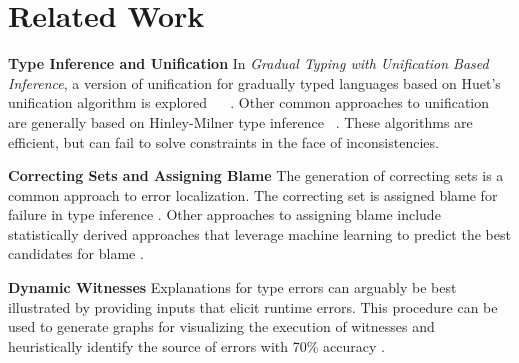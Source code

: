 \section{Related Work}
\label{sec:related}
\textbf{Type Inference and Unification} In \emph{Gradual Typing with Unification Based Inference}, a version of unification for gradually typed languages based on Huet's unification algorithm is explored ~\cite{GradualInfer} ~\cite{Huet}. Other common approaches to unification are generally based on Hinley-Milner type inference ~\cite{MilnerInfer}. These algorithms are efficient, but can fail to solve constraints in the face of inconsistencies.

\textbf{Correcting Sets and Assigning Blame} The generation of correcting sets is a common approach to error localization. The correcting set is assigned blame for failure in type inference \cite{sherrloc} \cite{typeinferDif} \cite{Pavlinovic2015}. Other approaches to assigning blame include statistically derived approaches that leverage machine learning to predict the best candidates for blame \cite{SeidelBlame}.

\textbf{Dynamic Witnesses} Explanations for type errors can arguably be best illustrated by providing inputs that elicit runtime errors. This procedure can be used to generate graphs for visualizing the execution of witnesses and heuristically identify the source of errors with 70\% accuracy \cite{Seidel2016}.
